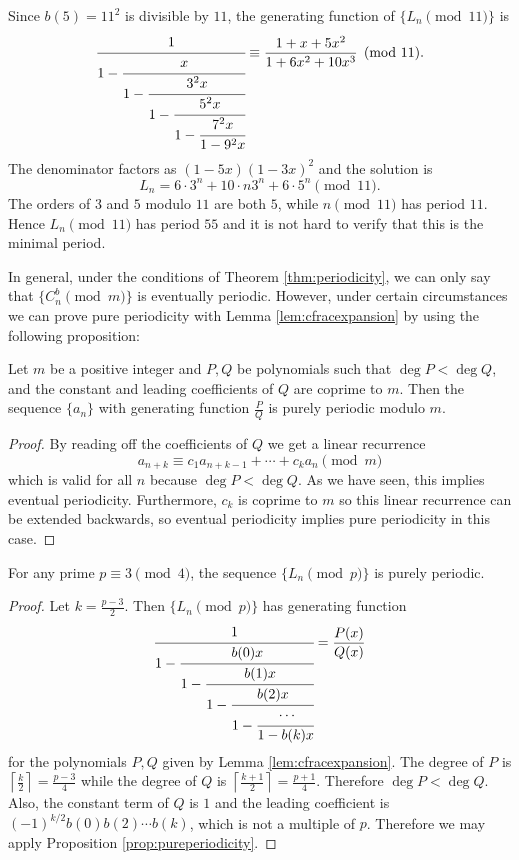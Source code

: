 \begin{example}\label{ex:Lnmod11}
    Since $b(5)=11^2$ is divisible by $11$, the generating function of $\{L_n\pmod{11}\}$ is
    \[\cfrac{1}{1-\cfrac{x}{1-\cfrac{3^2x}{1-\cfrac{5^2x}{1-\cfrac{7^2x}{1-9^2x}}}}}\equiv \frac{1+x+5x^2}{1+6x^2+10x^3}\pmod{11}.\]
    The denominator factors as $(1-5x)(1-3x)^2$ and the solution is
    \[L_n= 6\cdot 3^n+10\cdot n3^n+6\cdot 5^n\pmod{11}.\]
    The orders of $3$ and $5$ modulo $11$ are both $5$, while $n\pmod{11}$ has period $11$. Hence $L_n\pmod{11}$ has period $55$ and it is not hard to verify that this is the minimal period.
\end{example}


In general, under the conditions of Theorem \ref{thm:periodicity}, we can only say that $\{C^b_n\pmod{m}\}$ is eventually periodic. However, under certain circumstances we can prove pure periodicity with Lemma \ref{lem:cfracexpansion} by using the following proposition:

\begin{proposition}
\label{prop:pureperiodicity}
Let $m$ be a positive integer and $P, Q$ be polynomials such that $\deg P < \deg Q$, and the constant and leading coefficients of $Q$ are coprime to $m$. Then the sequence $\{a_n\}$ with generating function $\frac{P}{Q}$ is purely periodic modulo $m$.
\end{proposition}
\begin{proof}
By reading off the coefficients of $Q$ we get a linear recurrence
\[a_{n+k}\equiv c_{1}a_{n+k-1}+\dotsb+c_ka_{n}\pmod{m}\]
which is valid for all $n$ because $\deg P < \deg Q$. As we have seen, this implies eventual periodicity. Furthermore, $c_k$ is coprime to $m$ so this linear recurrence can be extended backwards, so eventual periodicity implies pure periodicity in this case.
\end{proof}

\begin{corollary}
For any prime $p\equiv 3\pmod{4}$, the sequence $\{L_n\pmod{p}\}$ is purely periodic.
\end{corollary}
\begin{proof}
Let $k=\frac{p-3}{2}$. Then $\{L_n\pmod{p}\}$ has generating function
\[\cfrac{1}{1-\cfrac{b(0)x}{1-\cfrac{b(1)x}{1-\cfrac{b(2)x}{1-\cfrac{\cdots}{1-b(k)x}}}}}=\frac{P(x)}{Q(x)}\]
for the polynomials $P, Q$ given by Lemma \ref{lem:cfracexpansion}. The degree of $P$ is $\left\lceil\frac{k}{2}\right\rceil=\frac{p-3}{4}$ while the degree of $Q$ is $\left\lceil\frac{k+1}{2}\right\rceil = \frac{p+1}{4}$. Therefore $\deg P < \deg Q$. Also, the constant term of $Q$ is $1$ and the leading coefficient is $(-1)^{k/2}b(0)b(2)\dotsm b(k)$, which is not a multiple of $p$. Therefore we may apply Proposition \ref{prop:pureperiodicity}.
\end{proof}

